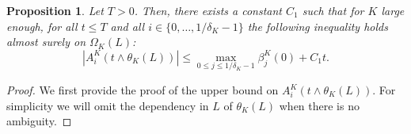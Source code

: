 \documentclass[JEP,XML,SOM,Unicode,published]{cedram}
\theoremstyle{plain}
\newtheorem{prop}[theorem]{Proposition}
\theoremstyle{remark}
\begin{document}
\begin{prop}
\label{est-varpart}
Let $T>0$. Then, there exists a constant $C_1$ such that for $K$ large enough, for all $t\leq T$ and all $i\in\{0,\ldots,1/\delta_K-1\}$ the following inequality holds almost surely on $\Omega_K(L)$:\vspace*{-3pt}\enlargethispage{\baselineskip}
\begin{equation*}
|A^K_i(t\wedge \theta_K(L)) |\leq \max_{0\leq j\leq 1/\delta_K-1}\beta^K_j(0) + C_1 t.
\end{equation*}
\end{prop}

\begin{proof}
We first provide the proof of the upper bound on $A_i^K(t\wedge \theta_K(L))$. For simplicity we will omit the dependency in $L$ of $\theta_K(L)$ when there is no ambiguity.


\end{proof}
\end{document}
